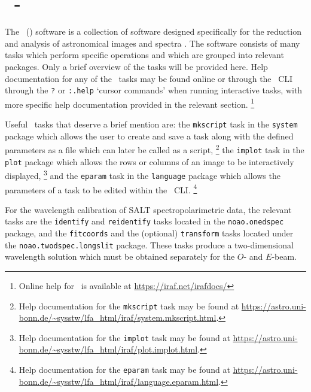 \section[\textsc{iraf}]{\iraf\ - } \label{sec:iraf}

The \iraf\ () software is a collection of software designed specifically for the reduction and analysis of astronomical images and spectra \citep{iraf:1986, iraf:1993}. The software consists of many tasks which perform specific operations and which are grouped into relevant packages. Only a brief overview of the tasks will be provided here. Help documentation for any of the \iraf\ tasks may be found online or through the \iraf\ \gls{CLI} through the \texttt{?} or \texttt{:.help} `cursor commands' when running interactive tasks, with more specific help documentation provided in the relevant section.%
\footnote{Online help for \iraf\ is available at \url{https://iraf.net/irafdocs/}}

Useful \iraf\ tasks that deserve a brief mention are: the \texttt{mkscript} task in the \texttt{system} package which allows the user to create and save a task along with the defined parameters as a file which can later be called as a script,%
\footnote{Help documentation for the \texttt{mkscript} task may be found at \url{https://astro.uni-bonn.de/~sysstw/lfa_html/iraf/system.mkscript.html}.}
the \texttt{implot} task in the \texttt{plot} package which allows the rows or columns of an image to be interactively displayed,%
\footnote{Help documentation for the \texttt{implot} task may be found at \url{https://astro.uni-bonn.de/~sysstw/lfa_html/iraf/plot.implot.html}.}
and the \texttt{eparam} task in the \texttt{language} package which allows the parameters of a task to be edited within the \iraf\ \gls{CLI}.%
\footnote{Help documentation for the \texttt{eparam} task may be found at \url{https://astro.uni-bonn.de/~sysstw/lfa_html/iraf/language.eparam.html}.}

For the wavelength calibration of \gls{SALT} spectropolarimetric data, the relevant tasks are the \texttt{identify} and \texttt{reidentify} tasks located in the \texttt{noao.onedspec} package, and the \texttt{fitcoords} and the (optional) \texttt{transform} tasks located under the \texttt{noao.twodspec.long\-slit} package. These tasks produce a two-dimensional wavelength solution which must be obtained separately for the $O$- and $E$-beam.

